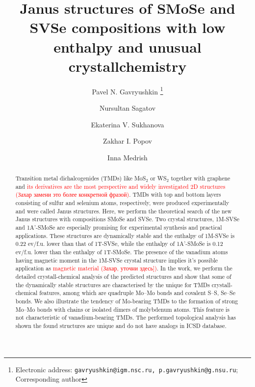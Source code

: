 \documentclass[a4paperm]{article}
\begin{document}

\title{Janus structures of SMoSe and SVSe compositions with low enthalpy and unusual crystallchemistry}


\author[1,2,3]{Pavel N. Gavryushkin
   \thanks{Electronic address: \texttt{gavryushkin@igm.nsc.ru, p.gavryushkin@g.nsu.ru}; Corresponding author}}     
\author[2]{Nursultan Sagatov}
\author[1]{Ekaterina V. Sukhanova}
\author[1]{Zakhar I. Popov}
\author[4]{Inna Medrish}



\date{}
\maketitle


\begin{abstract}
Transition metal dichalcogenides (TMDs) like MoS$_2$ or WS$_2$ together with graphene and \textcolor{red}{its derivatives are the most perspective and widely investigated 2D structures (Захар замени это более конкретной фразой)}.
TMDs with top and bottom layers consisting of sulfur and selenium atoms, respectively, were produced experimentally and were called Janus structures.
Here, we perform the theoretical search of the new Janus structures with compositions SMoSe and SVSe.
Two crystal structures, 1M-SVSe and 1A'-SMoSe are especially promising for experimental synthesis and practical applications.
These structures are dynamically stable and the enthalpy of 1M-SVSe is 0.22 ev/f.u. lower than that of 1T-SVSe, while the enthalpy of 1A'-SMoSe is 0.12 ev/f.u. lower than the enthalpy of 1T-SMoSe.
The presence of the vanadium atoms having magnetic moment in the 1M-SVSe crystal structure implies it's possible application as \textcolor{red}{magnetic material (Захар, уточни здесь])}.
In the work, we perform the detailed crystall-chemical analysis of the predicted structures and show that some of the dynamically stable structures are characterised by the unique for TMDs crystall-chemical features, among which are quadruple Mo--Mo bonds and covalent S--S, Se--Se bonds.
We also illustrate the tendency of Mo-bearing TMDs to the formation of strong Mo--Mo bonds with chains or isolated  dimers of molybdenum atoms.
This feature is not characteristic of vanadium-bearing TMDs.
The performed topological analysis has shown the found structures are unique and do not have analogs in ICSD database.

\end{abstract}
\end{document}
